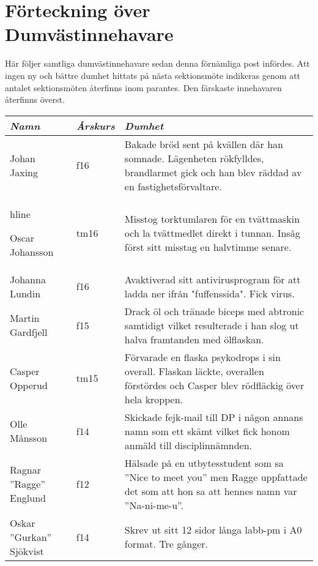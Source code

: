 
\section{Förteckning över Dumvästinnehavare}

\label{dumvast}

Här följer samtliga dumvästinnehavare sedan denna förnämliga post
infördes. Att ingen ny och bättre dumhet hittats på nästa sektionsmöte
indikeras genom att antalet sektionsmöten återfinns inom parantes. Den
färskaste innehavaren återfinns överst.

\begin{longtable}{p{55mm}lp{60mm}}
  \emph{Namn} & \emph{Årskurs} & \emph{Dumhet}\\ \hline
  
  Johan Jaxing & f16 & Bakade bröd sent på kvällen där han somnade. Lägenheten rökfylldes, brandlarmet gick och han blev räddad av en fastighetsförvaltare. \\hline

  Oscar Johansson & tm16 & Misstog torktumlaren för en tvättmaskin och la tvättmedlet direkt i tunnan. Insåg först sitt misstag en halvtimme senare.\\ \hline

  Johanna Lundin & f16 & Avaktiverad sitt antivirusprogram för att ladda ner ifrån "fuffenssida". Fick virus. \\ \hline

  Martin Gardfjell & f15 & Drack öl och tränade biceps med abtronic samtidigt vilket resulterade i han slog ut halva framtanden med ölflaskan.\\ \hline

  Casper Opperud & tm15 & Förvarade en flaska psykodrops i sin overall. Flaskan läckte, overallen förstördes och Casper blev rödfläckig över hela kroppen.\\ \hline

  Olle Månsson & f14 & Skickade fejk-mail till DP i någon annans namn som ett skämt vilket fick honom anmäld till disciplinnämnden.\\ \hline

  Ragnar ''Ragge'' Englund & f12 & Hälsade på en utbytesstudent som sa ''Nice to meet you'' men Ragge uppfattade det som att hon sa att hennes namn var ''Na-ni-me-u''.\\ \hline

  Oskar ''Gurkan'' Sjökvist & f14 & Skrev ut sitt 12 sidor långa labb-pm i A0 format. Tre gånger.\\ \hline


\end{longtable}
